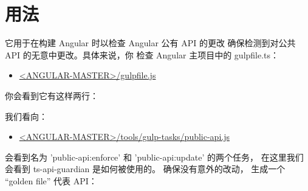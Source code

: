 \section{用法}


它用于在构建 Angular 时以检查 Angular 公有 API 的更改
确保检测到对公共 API 的无意中更改。具体来说，你
检查 Angular 主项目中的 gulpfile.ts：

\begin{itemize}
  \item \href{https://github.com/angular/angular/blob/master/gulpfile.js}
        {<ANGULAR-MASTER>/gulpfile.js}
\end{itemize}


你会看到它有这样两行：




我们看向：

\begin{itemize}
  \item \href{https://github.com/angular/angular/blob/master/tools/gulp-tasks/public-api.js}
        {<ANGULAR-MASTER>/tools/gulp-tasks/public-api.js}
\end{itemize}


会看到名为 'public-api:enforce' 和 'public-api:update' 的两个任务，
在这里我们会看到 ts-api-guardian 是如何被使用的。 确保没有意外的改动，
 生成一个 “golden file” 代表 API：


